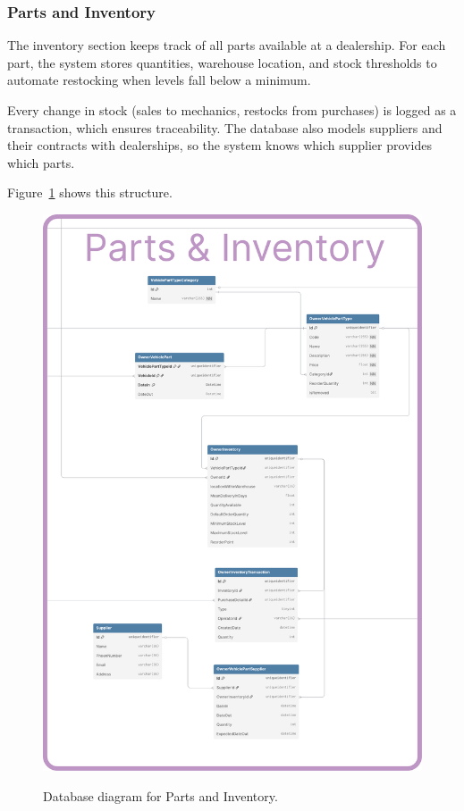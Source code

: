 \subsubsection{Parts and Inventory} 


The inventory section keeps track of all parts available at a dealership. For each part, the system stores quantities, warehouse location, and stock thresholds to automate restocking when levels fall below a minimum.

Every change in stock (sales to mechanics, restocks from purchases) is logged as a transaction, which ensures traceability. The database also models suppliers and their contracts with dealerships, so the system knows which supplier provides which parts.

Figure~\ref{fig:dbParts} shows this structure.

\begin{figure}[h]
  \caption{Database diagram for Parts and Inventory.}
  \centering
  \includegraphics[width=\textwidth]{figs/dbDiagrams/Parts_and_Inventory}
  \label{fig:dbParts}
\end{figure}


